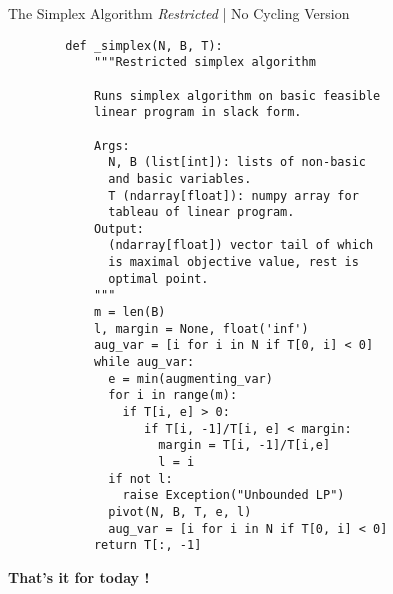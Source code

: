 \documentclass[aspectratio = 169]{beamer}
\begin{document}
\begin{frame}[fragile]{The Simplex Algorithm \emph{Restricted} | No Cycling Version}
  \begin{overlayarea}{1.1\textwidth}{.75\textheight}
  \setlength{\columnsep}{-10pt}
  \begin{multicols}{2}
    \scriptsize{
      \begin{verbatim}
        def _simplex(N, B, T):
            """Restricted simplex algorithm

            Runs simplex algorithm on basic feasible
            linear program in slack form.

            Args:
              N, B (list[int]): lists of non-basic
              and basic variables.
              T (ndarray[float]): numpy array for
              tableau of linear program.
            Output:
              (ndarray[float]) vector tail of which
              is maximal objective value, rest is
              optimal point.
            """
            m = len(B)
            l, margin = None, float('inf')
            aug_var = [i for i in N if T[0, i] < 0]
            while aug_var:
              e = min(augmenting_var)
              for i in range(m):
                if T[i, e] > 0:
                   if T[i, -1]/T[i, e] < margin:
                     margin = T[i, -1]/T[i,e]
                     l = i
              if not l:
                raise Exception("Unbounded LP")
              pivot(N, B, T, e, l)
              aug_var = [i for i in N if T[0, i] < 0]
            return T[:, -1]
      \end{verbatim}
    }
  \end{multicols}
  \end{overlayarea}
\end{frame}

\begin{frame}
  \centering
  {\huge \textbf{That's it for today !}}
\end{frame}
\end{document}
